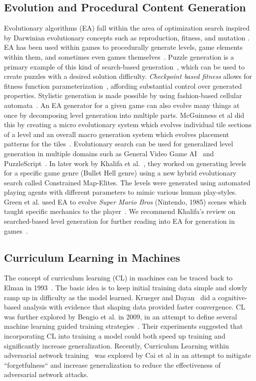 \documentclass[letterpaper]{article} %
\begin{document}
\subsection{Evolution and Procedural Content Generation}
Evolutionary algorithms (EA) fall within the area of optimization search inspired by Darwinian evolutionary concepts such as reproduction, fitness, and mutation \cite{togelius2016introduction}. EA has been used within games to procedurally generate levels, game elements within them, and sometimes even games themselves~\cite{khalifa2017general}. Puzzle generation is a primary example of this kind of search-based generation~\cite{ashlock2010automatic}, which can be used to create puzzles with a desired solution difficulty. \emph{Checkpoint based fitness} allows for fitness function parameterization~\cite{ashlock2011search}, affording substantial control over generated properties. Stylistic generation is made possible by using fashion-based cellular automata~\cite{ashlock2015evolvable}. An EA generator for a given game can also evolve many things at once by decomposing level generation into multiple parts. McGuinness et al did this by creating a micro evolutionary system which evolves individual tile sections of a level and an overall macro generation system which evolves placement patterns for the tiles~\cite{mcguinness2011decomposing}.
Evolutionary search can be used for generalized level generation in multiple domains such as General Video Game AI~\cite{khalifa2016general} and PuzzleScript~\cite{khalifa2015automatic}. In later work by Khalifa et al.~\cite{khalifa2018talakat}, they worked on generating levels for a specific game genre (Bullet Hell genre) using a new hybrid evolutionary search called Constrained Map-Elites. The levels were generated using automated playing agents with different parameters to mimic various human play-styles. Green et al. used EA to evolve \emph{Super Mario Bros} (Nintendo, 1985) scenes which taught specific mechanics to the player~\cite{green2018generating}.
We recommend Khalifa's review on searched-based level generation for further reading into EA for generation in games~\cite{khalifa2015literature}.

\subsection{Curriculum Learning in Machines}
The concept of curriculum learning (CL) in machines can be traced back to Elman in 1993~\cite{elman1993learning}. The basic idea is to keep initial training data simple and slowly ramp up in difficulty as the model learned.  Krueger and Dayan~\cite{krueger2009flexible} did a cognitive-based analysis with evidence that shaping data provided faster convergence. CL was further explored by Bengio et al. in 2009, in an attempt to define several machine learning guided training strategies~\cite{bengio2009curriculum}. Their experiments suggested that incorporating CL into training a model could both speed up training and significantly increase generalization. Recently, Curriculum Learning within adversarial network training~\cite{cai2018curriculum} was explored by Cai et al in an attempt to mitigate ``forgetfulness`` and increase generalization to reduce the effectiveness of adversarial network attacks.
\end{document}
